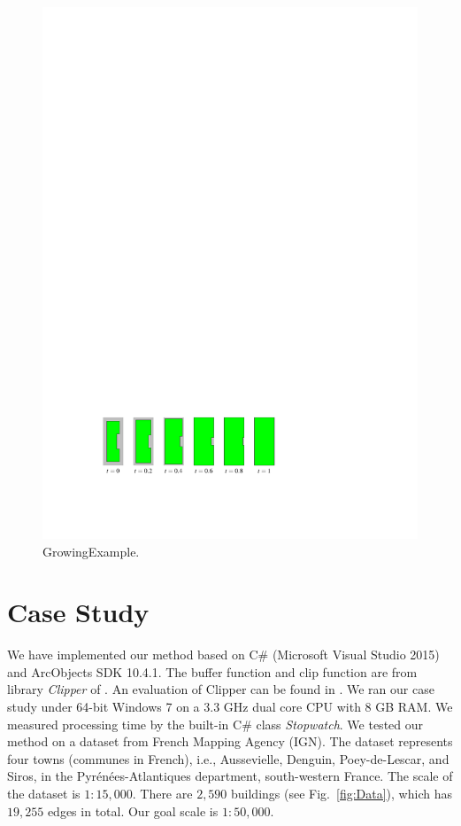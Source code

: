 \documentclass[graybox]{svmult}
\newcommand{\fig}{Fig.~}
\begin{document}
\begin{figure}[tb]
	\centering
	\includegraphics{GrowingExample}
	\caption{GrowingExample.}
	\label{fig:GrowingExample}
\end{figure}

\section{Case Study}
\label{sec:CaseStudy}
We have implemented our method based on
C\# (Microsoft Visual Studio 2015) and ArcObjects SDK 10.4.1.
The buffer function and clip function are from library \emph{Clipper} 
of \textcite{Johnson2014}.
An evaluation of Clipper can be found in \textcite{Palfrader2015}.
We ran our case study under 64-bit 
Windows 7 on a 3.3 GHz dual core CPU with 8 GB RAM.
We measured processing time by the built-in C\# class 
\emph{Stopwatch}.
We tested our method on a dataset from French Mapping Agency (IGN).
The dataset represents four towns (communes in French), i.e., Aussevielle, 
Denguin,  Poey-de-Lescar, and Siros, in the 
Pyr\'en\'ees-Atlantiques department, south-western France.
The scale of the dataset is $1:15{,}000$.
There are $2{,}590$ buildings (see \fig\ref{fig:Data}), 
which has $19{,}255$ edges in total.
Our goal scale is $1:50{,}000$.
\end{document}
